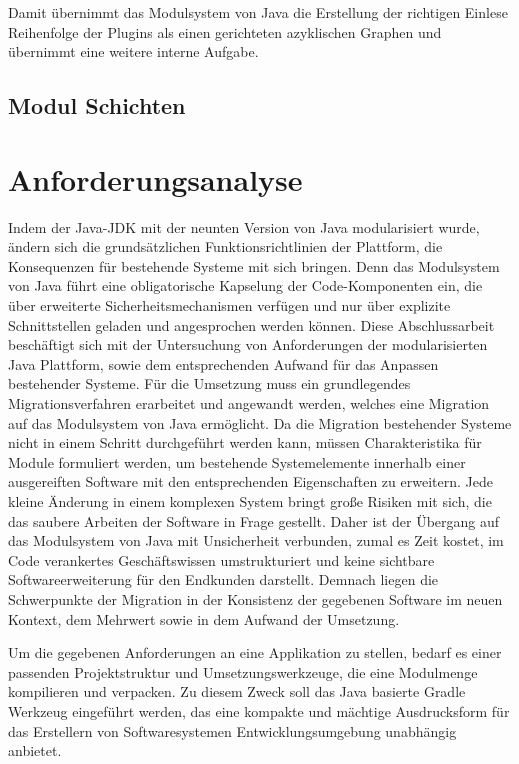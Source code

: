 		Damit übernimmt das Modulsystem von Java die Erstellung der richtigen Einlese Reihenfolge der Plugins als einen gerichteten azyklischen Graphen und übernimmt eine weitere interne Aufgabe.
	\subsection{Modul Schichten}\label{sub:module_layer}
	
\section{Anforderungsanalyse} 
	Indem der Java-JDK mit der neunten Version von Java modularisiert wurde, ändern sich die grundsätzlichen Funktionsrichtlinien der Plattform, die Konsequenzen für bestehende Systeme mit sich bringen. Denn das Modulsystem von Java führt eine obligatorische Kapselung der Code-Komponenten ein, die über erweiterte Sicherheitsmechanismen verfügen und nur über explizite Schnittstellen geladen und angesprochen werden können.\newline 
	Diese Abschlussarbeit beschäftigt sich mit der Untersuchung von Anforderungen der modularisierten Java Plattform, sowie dem entsprechenden Aufwand für das Anpassen bestehender Systeme. \newline
	Für die Umsetzung muss ein grundlegendes Migrationsverfahren erarbeitet und angewandt werden, welches eine Migration auf das Modulsystem von Java ermöglicht. Da die Migration bestehender Systeme nicht in einem Schritt durchgeführt werden kann, müssen Charakteristika für Module formuliert werden, um bestehende Systemelemente innerhalb einer ausgereiften Software mit den entsprechenden Eigenschaften zu erweitern.\newline
	Jede kleine Änderung in einem komplexen System bringt große Risiken mit sich, die das saubere Arbeiten der Software in Frage gestellt. Daher ist der Übergang auf das Modulsystem von Java mit Unsicherheit verbunden, zumal es Zeit kostet, im Code verankertes Geschäftswissen umstrukturiert und keine sichtbare Softwareerweiterung für den Endkunden darstellt. Demnach liegen die Schwerpunkte der Migration in der Konsistenz der gegebenen Software im neuen Kontext, dem Mehrwert sowie in dem Aufwand der Umsetzung. \bigbreak

	Um die gegebenen Anforderungen an eine Applikation zu stellen, bedarf es einer passenden Projektstruktur und Umsetzungswerkzeuge, die eine Modulmenge kompilieren und verpacken. Zu diesem Zweck soll das Java basierte Gradle Werkzeug eingeführt werden, das eine kompakte und mächtige Ausdrucksform für das Erstellern von Softwaresystemen Entwicklungsumgebung unabhängig anbietet. \bigbreak

